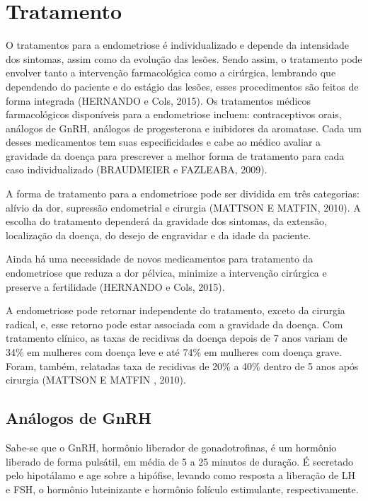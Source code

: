\documentclass[12pt]{article} %
\begin{document}
\section{Tratamento} 

O tratamentos para a endometriose é individualizado e depende da
intensidade dos sintomas, assim como da evolução das lesões. Sendo
assim, o tratamento pode envolver tanto a intervenção farmacológica
como a cirúrgica, lembrando que dependendo do paciente e do estágio
das lesões, esses procedimentos são feitos de forma integrada (HERNANDO
e Cols, 2015). Os tratamentos médicos farmacológicos disponíveis para
a endometriose incluem: contraceptivos orais, análogos de GnRH,
análogos de progesterona e inibidores da aromatase. Cada um desses
medicamentos tem suas especificidades e cabe ao médico avaliar a
gravidade da doença para prescrever a melhor forma de tratamento para
cada caso individualizado (BRAUDMEIER e FAZLEABA, 2009).

A forma de tratamento para a endometriose pode ser dividida em três
categorias: alívio da dor, supressão endometrial e cirurgia (MATTSON E MATFIN, 2010). A escolha do tratamento dependerá da gravidade dos
sintomas, da extensão, localização da doença, do desejo de engravidar
e da idade da paciente.

Ainda há uma necessidade de novos medicamentos para tratamento da
endometriose que reduza a dor pélvica, minimize a intervenção
cirúrgica e preserve a fertilidade (HERNANDO e Cols, 2015).

A endometriose pode retornar independente do tratamento, exceto da
cirurgia radical, e, esse retorno pode estar associada com a gravidade
da doença. Com tratamento clínico, as taxas de recidivas da doença
depois de 7 anos variam de 34\% em mulheres com doença leve e até 74\%
em mulheres com doença grave. Foram, também, relatadas taxa de
recidivas de 20\% a 40\% dentro de 5 anos após cirurgia (MATTSON E MATFIN , 2010).

\subsection{Análogos de GnRH}

Sabe-se que o GnRH, hormônio liberador de gonadotrofinas, é um
hormônio liberado de forma pulsátil, em média de 5 a 25 minutos de
duração. É secretado pelo hipotálamo e age sobre a hipófise, levando
como resposta a liberação de LH e FSH, o hormônio luteinizante e
hormônio folículo estimulante, respectivamente.
\end{document}
